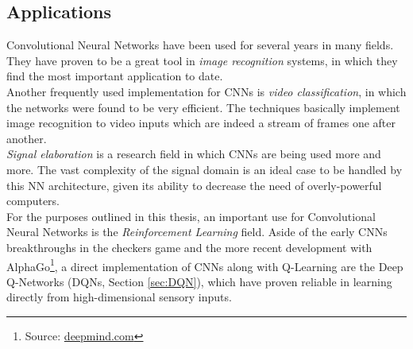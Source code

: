 \subsection{Applications}

Convolutional Neural Networks have been used for several years in many fields. They have proven to be a great tool in \textit{image recognition} systems, in which they find the most important application to date. 
\\
\indent Another frequently used implementation for CNNs is \textit{video classification}, in which the networks were found to be very efficient. The techniques basically implement image recognition to video inputs which are indeed a stream of frames one after another. 
\\
\indent \textit{Signal elaboration} is a research field in which CNNs are being used more and more. The vast complexity of the signal domain is an ideal case to be handled by this NN architecture, given its ability to decrease the need of overly-powerful computers.
\\
\indent For the purposes outlined in this thesis, an important use for Convolutional Neural Networks is the \textit{Reinforcement Learning} field. Aside of the early CNNs breakthroughs in the checkers game and the more recent development with AlphaGo\footnote{Source: \href{https://deepmind.com/research/alphago/}{deepmind.com}}, a direct implementation of CNNs along with Q-Learning are the Deep Q-Networks (DQNs, Section \ref{sec:DQN}), which have proven reliable in learning directly from high-dimensional sensory inputs.
